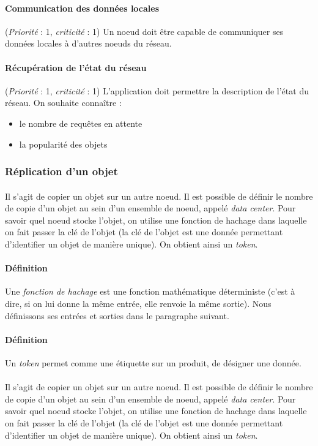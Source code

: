 \documentclass[12pt]{article}
\newcommand{\besoin}[2] {
  (\textit{Priorité} : #1, \textit{criticité} : #2)
}
\begin{document}
\paragraph{Communication des données locales} \besoin{1}{1} Un noeud doit être capable de communiquer ses données locales à d'autres noeuds du réseau.

\paragraph{Récupération de l'état du réseau} \besoin{1}{1} L'application doit permettre la description de l'état du réseau.
On souhaite connaître : 
\begin{itemize}
 \item le nombre de requêtes en attente
 \item la popularité des objets
\end{itemize}

\subsubsection{Réplication d'un objet}

\paragraph{} Il s'agit de copier un objet sur un autre noeud. Il est possible de définir le nombre de copie d'un objet au sein d'un ensemble de noeud, appelé \textit{data center}. 
Pour savoir quel noeud stocke l'objet, on utilise une fonction de hachage dans laquelle on fait passer la clé de l'objet (la clé de l'objet est une donnée permettant d'identifier un objet de manière unique).
On obtient ainsi un \textit{token}.


\paragraph{Définition} Une \textit{fonction de hachage} est une fonction mathématique déterministe (c'est à dire, si on lui donne la même entrée, elle renvoie la même sortie). Nous définissons ses entrées et sorties dans le paragraphe suivant.

\paragraph{Définition} Un \textit{token} permet comme une étiquette sur un produit, de désigner une donnée.

\paragraph{} Il s'agit de copier un objet sur un autre noeud. Il est possible de définir le nombre de copie d'un objet au sein d'un ensemble de noeud, appelé \textit{data center}. Pour savoir quel noeud stocke l'objet, on utilise une fonction de hachage dans laquelle on fait passer la clé de l'objet (la clé de l'objet est une donnée permettant d'identifier un objet de manière unique). On obtient ainsi un \textit{token}.
\end{document}
